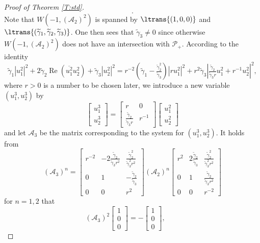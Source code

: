 \documentclass[11pt,a4paper,oneside]{amsart}
\theoremstyle{plain}
\theoremstyle{remark}
\numberwithin{equation}{section}
\renewcommand{\Re}{\operatorname{Re}}
\theoremstyle{definition}
\begin{document}
\begin{proof}[Proof of Theorem \ref{T:std}]
\[	.
\]
Note that $W(-1,(\mathscr{A}_2)^2)$ is spanned by
$\ltrans{(1,0,0)}$ and $\ltrans{(\widetilde{\gamma}_1,\widetilde{\gamma}_2,\widetilde{\gamma}_3)}$.
One then sees that $\widetilde{\gamma}_3\neq0$
since otherwise $W(-1,(\mathscr{A}_2)^2)$ does not have an intersection with $\mathcal{P}_+$. According to the identity
\[
	\widetilde{\gamma}_1 |u_1^2|^2 + 2 \widetilde{\gamma}_2 \Re (\overline{u_1^2}u_2^2) + \widetilde{\gamma}_3 |u_2^2|^2 =
r^{-2} (\widetilde{\gamma}_1-\tfrac{\widetilde{\gamma}_2^2}{\widetilde{\gamma}_3})|r u_1^2|^2 +r^2 \widetilde{\gamma}_3 |  \tfrac{\widetilde{\gamma}_2}{\widetilde{\gamma}_3r} u_1^2+r^{-1} u_2^2|^2,
\]
where $r>0$ is a number to be chosen later,
we introduce a new variable $(u_1^3,u^3_2)$ by
\[
	\begin{bmatrix} u_1^3 \\ u_2^3 \end{bmatrix}
	= \begin{bmatrix} r & 0 \\ \frac{\widetilde{\gamma}_2}{\widetilde{\gamma}_3r} & r^{-1} \end{bmatrix}
	\begin{bmatrix} u_1^2 \\ u_2^2 \end{bmatrix}
\]
and let $\mathscr{A}_3$ be the matrix corresponding to the system for $(u_1^3,u^3_2)$.
It holds from
\[
	(\mathscr{A}_3)^n = \begin{bmatrix} r^{-2} & -2\frac{\widetilde{\gamma}_2}{\widetilde{\gamma}_3r^2}  & \frac{\widetilde{\gamma}_2^2}{\widetilde{\gamma}_3^2r^2} \\ 0 & 1 & -\frac{\widetilde{\gamma}_2}{\widetilde{\gamma}_3} \\ 0 &0 & r^2 \end{bmatrix} (\mathscr{A}_2)^n 
\begin{bmatrix} r^2 & 2\frac{\widetilde{\gamma}_2}{\widetilde{\gamma}_3} & \frac{\widetilde{\gamma}_2^2}{\widetilde{\gamma}_3^2r^2} \\ 0 & 1 & \frac{\widetilde{\gamma}_2}{\widetilde{\gamma}_3r^2} \\ 0 & 0 & r^{-2} \end{bmatrix}
\]
for $n=1,2$ that
\[
	(\mathscr{A}_3)^2\begin{bmatrix} 1 \\0\\0 \end{bmatrix}
	=- \begin{bmatrix} 1 \\0\\0 \end{bmatrix},\qquad
\]
\end{proof}
\end{document}
